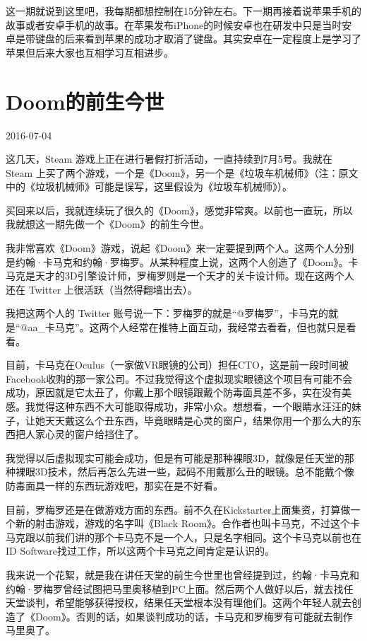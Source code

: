 \documentclass[
  letterpaper,
  DIV=11,
  numbers=noendperiod]{scrreprt}
\begin{document}
这一期就说到这里吧，我每期都想控制在15分钟左右。下一期再接着说苹果手机的故事或者安卓手机的故事。在苹果发布iPhone的时候安卓也在研发中只是当时安卓是带键盘的后来看到苹果的成功才取消了键盘。其实安卓在一定程度上是学习了苹果但后来大家也互相学习互相进步。


\chapter{Doom的前生今世}\label{doomux7684ux524dux751fux4ecaux4e16}

2016-07-04

这几天，Steam 游戏上正在进行暑假打折活动，一直持续到7月5号。我就在 Steam
上买了两个游戏，一个是《Doom》，另一个是《垃圾车机械师》（注：原文中的《垃圾机械师》可能是误写，这里假设为《垃圾车机械师》）。

买回来以后，我就连续玩了很久的《Doom》，感觉非常爽。以前也一直玩，所以我就想这一期先做一个《Doom》的前生今世。

我非常喜欢《Doom》游戏，说起《Doom》来一定要提到两个人。这两个人分别是约翰·卡马克和约翰·罗梅罗。从某种程度上说，这两个人创造了《Doom》。卡马克是天才的3D引擎设计师，罗梅罗则是一个天才的关卡设计师。现在这两个人还在
Twitter 上很活跃（当然得翻墙出去）。

我把这两个人的 Twitter
账号说一下：罗梅罗的就是``@罗梅罗''，卡马克的就是``@aa\_卡马克''。这两个人经常在推特上面互动，我经常去看看，但也就只是看看。

目前，卡马克在Oculus（一家做VR眼镜的公司）担任CTO，这是前一段时间被Facebook收购的那一家公司。不过我觉得这个虚拟现实眼镜这个项目有可能不会成功，原因就是它太丑了，你戴上那个眼镜跟戴个防毒面具差不多，实在没有美感。我觉得这种东西不大可能取得成功，非常小众。想想看，一个眼睛水汪汪的妹子，让她天天戴这么个丑东西，毕竟眼睛是心灵的窗户，结果你用一个那么大的东西把人家心灵的窗户给挡住了。

我觉得以后虚拟现实可能会成功，但是有可能是那种裸眼3D，就像是任天堂的那种裸眼3D技术，然后再怎么先进一些，起码不用戴那么丑的眼镜。总不能戴个像防毒面具一样的东西玩游戏吧，那实在是不好看。

目前，罗梅罗还是在做游戏方面的东西。前不久在Kickstarter上面集资，打算做一个新的射击游戏，游戏的名字叫《Black
Room》。合作者也叫卡马克，不过这个卡马克跟以前我们讲的那个卡马克不是一个人，只是名字相同。这个卡马克以前也在ID
Software找过工作，所以这两个卡马克之间肯定是认识的。

我来说一个花絮，就是我在讲任天堂的前生今世里也曾经提到过，约翰·卡马克和约翰·罗梅罗曾经试图把马里奥移植到PC上面。然后两个人做好以后，就去找任天堂谈判，希望能够获得授权，结果任天堂根本没有理他们。这两个年轻人就去创造了《Doom》。否则的话，如果谈判成功的话，卡马克和罗梅罗有可能就去制作马里奥了。
\end{document}
